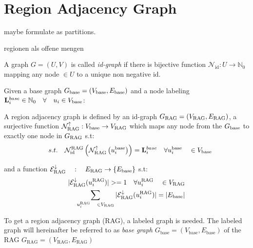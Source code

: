 \chapter{Region Adjacency Graph}\label{ch:regio_adjacency_graph}
 maybe formulate as partitions.

regionen als offene mengen
    
  \begin{MyDef}[Id-Graph]
    A graph $G = (U, V )$ is called \emph{id-graph} if there is
    bijective function  $\mathcal{N}_{\text{id}}: U \rightarrow \mathbb{N}_0 $ 
    mapping any node $\in U$ to a unique non negative id.
  \end{MyDef}
    

  \begin{MyDef}
    Given a base graph $G_{\text{base}} = (V_{\text{base}}, E_{\text{base}})$ and 
    a node labeling $\mathbf{L}_{i}^{base} \in  \mathbb{N}_0 \quad \forall \quad u_i \in V_{\text{base}}$:

    A region adjacency graph  is defined by an id-graph  $G_{\text{RAG}} = (V_{\text{RAG}}, E_{\text{RAG}})$,
    a surjective function $ \mathcal{N}_{\text{RAG}}^{\uparrow} : V_{\text{base}} \rightarrow V_{\text{RAG}}$ which maps
    any node from the $G_{\text{base}}$ to exactly one node in $G_{\text{RAG}}$ s.t:
    \[
        \quad s.t. \quad
        \mathcal{N}_{\text{id}}^{\text{RAG}} 
        \left(
            \mathcal{N}_{\text{RAG}}^{\uparrow}
            \left(
                u_i^{\text{base}}
            \right)
        \right) 
        = \mathbf{L}_i^{base}
        \quad \forall u_i^{\text{base}} \quad \in V_{\text{base}}
    \]

    and a function $\mathcal{E}_{\text{RAG}}^{\downarrow} \quad : \quad E_{\text{RAG}} \rightarrow \{  E_{\text{base}} \} $
    s.t:
    \begin{align*}
        |\mathcal{E}_{\text{RAG}}^{\downarrow}(u_i^{\text{RAG}})| >=1 
            \quad \forall u_i^{\text{RAG}} \quad \in V_{\text{RAG}}  \\
        \sum _{u_i^{\text{RAG}} \quad \in V_{\text{RAG}} } 
            |\mathcal{E}_{\text{RAG}}^{\downarrow}(u_i^{\text{RAG}})| = |E_{\text{base}}|
    \end{align*}

  \end{MyDef}



To get a region adjacency graph (RAG), a labeled graph is needed.
The labeled graph will hereinafter be referred to as \emph{base graph} 
$G_{\text{base}}=(V_{\text{base}},E_{\text{base}})$
of the RAG $G_{\text{RAG}}=(V_{\text{RAG}},E_{\text{RAG}})$


